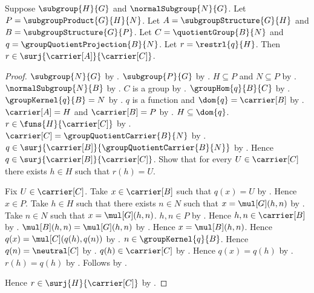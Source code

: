 \begin{theorem}\label{group_second_isomorphism_restriction_surjective}
    Suppose $\subgroup{H}{G}$ and $\normalSubgroup{N}{G}$.
    Let $P=\subgroupProduct{G}{H}{N}$.
    Let $A=\subgroupStructure{G}{H}$ and
        $B=\subgroupStructure{G}{P}$.
    Let $C=\quotientGroup{B}{N}$ and
        $q=\groupQuotientProjection{B}{N}$.
    Let $r=\restrl{q}{H}$.
    Then $r\in\surj{\carrier[A]}{\carrier[C]}$.
\end{theorem}
\begin{proof}
    $\subgroup{N}{G}$ by .
    $\subgroup{P}{G}$ by .
    $H\subseteq P$ and $N\subseteq P$ by
        .
    $\normalSubgroup{N}{B}$ by
        .
    $C$ is a group by .
    $\groupHom{q}{B}{C}$ by
        .
    $\groupKernel{q}{B}=N$ by
        .
    $q$ is a function and $\dom{q}=\carrier[B]$ by
        .
    $\carrier[A]=H$ and $\carrier[B]=P$ by
        .
    $H\subseteq\dom{q}$.
    $r\in\funs{H}{\carrier[C]}$ by
        .
    $\carrier[C]=\groupQuotientCarrier{B}{N}$ by
        .
    $q\in\surj{\carrier[B]}{\groupQuotientCarrier{B}{N}}$ by
        .
    Hence $q\in\surj{\carrier[B]}{\carrier[C]}$.
    Show that for every $U\in\carrier[C]$ there exists $h\in H$
        such that $r(h)=U$.
    \begin{subproof}
        Fix $U\in\carrier[C]$.
        Take $x\in\carrier[B]$ such that $q(x)=U$ by
            .
        Hence $x\in P$.
        Take $h\in H$ such that there exists $n\in N$ such that
            $x=\mul[G](h,n)$ by
            .
        Take $n\in N$ such that $x=\mul[G](h,n)$.
        $h,n\in P$ by .
        Hence $h,n\in\carrier[B]$ by
            .
        $\mul[B](h,n)=\mul[G](h,n)$ by
            .
        Hence $x=\mul[B](h,n)$.
        Hence $q(x)=\mul[C](q(h),q(n))$ by
            .
        $n\in\groupKernel{q}{B}$.
        Hence $q(n)=\neutral[C]$ by .
        $q(h)\in\carrier[C]$ by .
        Hence $q(x)=q(h)$ by
            .
        $r(h)=q(h)$ by .
        Follows by \auto.
    \end{subproof}
    Hence $r\in\surj{H}{\carrier[C]}$ by .
\end{proof}


